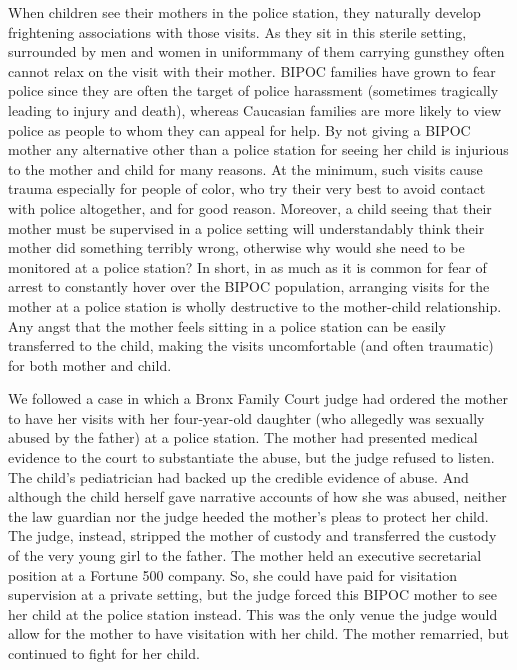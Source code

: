 When children see their mothers in the police station, they naturally
develop frightening associations with those visits. As they sit in this 
sterile setting, surrounded by men and women in uniform\mdash{}many of them
carrying guns\mdash{}they often cannot relax on the visit with their mother.
BIPOC families have grown to fear police since they are often the target
of police harassment (sometimes tragically leading to injury and death),
whereas Caucasian families are more likely to view police as people to
whom they can appeal for help. By not giving a BIPOC mother any 
alternative other than a police station for seeing her child is injurious to
the mother and child for many reasons. At the minimum, such visits
cause trauma especially for people of color, who try their very best to
avoid contact with police altogether, and for good reason. Moreover, a
child seeing that their mother must be supervised in a police setting will
understandably think their mother did something terribly wrong, 
otherwise why would she need to be monitored at a police station?
In short, in as much as
it is common for fear of arrest to constantly hover over the
BIPOC population, arranging visits for the mother at a police station is
wholly destructive to the 
mother\hspace{-.5pt}-\hspace{.5pt}child relationship. Any angst that the
mother feels sitting in a police station can be easily transferred to the
child, making the visits uncomfortable (and often traumatic) for both
mother and child. \pfl{}

We followed a case in which a Bronx Family Court judge had ordered
the mother to have her visits with her four-year-old daughter (who 
allegedly was sexually abused by the father) at a police station. The mother
had presented medical evidence to the court to substantiate the abuse,
but the judge refused to listen. The child’s pediatrician had backed up
the credible evidence of abuse. And although the child herself gave 
narrative accounts of how she was abused, neither the law guardian nor
the judge heeded the mother’s pleas to protect her child. The judge, 
instead, stripped the mother of custody and transferred the custody of
the very young girl to the father. The mother held an executive 
secretarial position at a Fortune 500 company. So, she could have paid
for visitation supervision at a private setting, but the judge forced this
BIPOC mother to see her child at the police station instead. This was
the only venue the judge would allow for the mother to have visitation
with her child. The mother remarried, but continued to fight for her
child. \pfl{}

